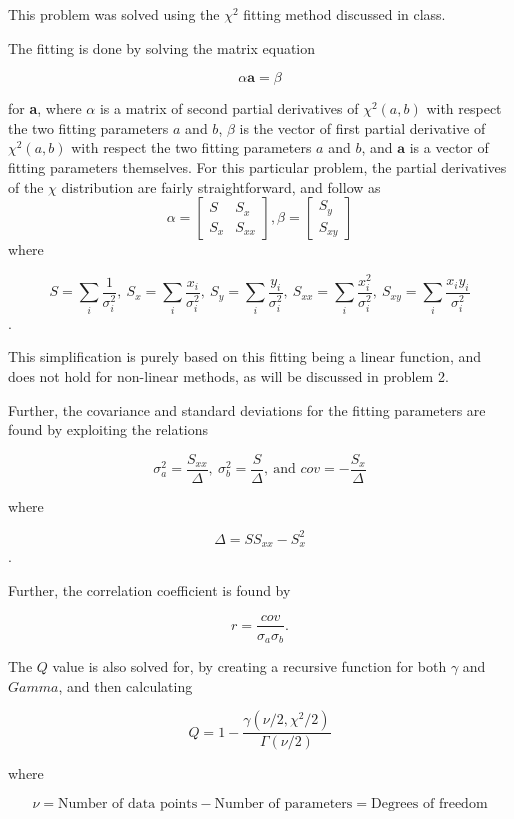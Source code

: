 \documentclass[10pt,letter]{article}
\begin{document}
This problem was solved using the $\chi^2$ fitting method discussed in class.

The fitting is done by solving the matrix equation 

$$\alpha \textbf{a} = \beta$$

for \textbf{a}, where $\alpha$ is a matrix of second partial derivatives of $\chi^2(a, b)$ with respect the two fitting parameters $a$ and $b$, $\beta$ is the vector of first partial derivative of $\chi^2(a, b)$ with respect the two fitting parameters $a$ and $b$, and $\textbf{a}$ is a vector of fitting parameters themselves. For this particular problem, the partial derivatives of the $\chi$ distribution are fairly straightforward, and follow as
\[\alpha = 
\begin{bmatrix}
S & S_x \\
S_x & S_{xx} 
\end{bmatrix},
\beta = 
\begin{bmatrix}
S_y  \\
S_{xy} 
\end{bmatrix}
\]
where

$$ S = \sum_i \frac{1}{\sigma_i^2}, \ S_x = \sum_i \frac{x_i}{\sigma_i^2}, \  S_y = \sum_i \frac{y_i}{\sigma_i^2}, \  S_{xx} = \sum_i \frac{x_i^2}{\sigma_i^2}, \  S_{xy} = \sum_i \frac{x_iy_i}{\sigma_i^2} $$.

This simplification is purely based on this fitting being a linear function, and does not hold for non-linear methods, as will be discussed in problem 2.

Further, the covariance and standard deviations for the fitting parameters are found by exploiting the relations

$$\sigma_a^2 = \frac{S_{xx}}{\Delta}, \ \sigma_b^2 = \frac{S}{\Delta},\  \text{and } cov = -\frac{S_x}{\Delta}$$

where

$$ \Delta = SS_{xx}-S_x^2 $$.

Further, the correlation coefficient is found by

$$r = \frac{cov}{\sigma_a \sigma_b} .$$

The $Q$ value is also solved for, by creating a recursive function for both $\gamma$ and $Gamma$, and then calculating

$$ Q = 1 - \frac{\gamma(\nu/2,\chi^2/2)}{\Gamma(\nu/2)}$$

where

$$ \nu = \text{Number of data points} - \text{Number of parameters} = \text{Degrees of freedom}$$
\end{document}
